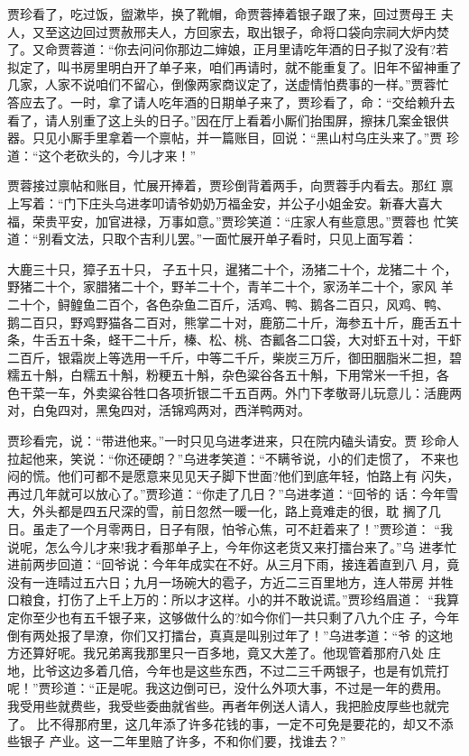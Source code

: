 贾珍看了，吃过饭，盥漱毕，换了靴帽，命贾蓉捧着银子跟了来，回过贾母王
夫人，又至这边回过贾赦邢夫人，方回家去，取出银子，命将口袋向宗祠大炉内焚
了。又命贾蓉道：“你去问问你那边二婶娘，正月里请吃年酒的日子拟了没有?若
拟定了，叫书房里明白开了单子来，咱们再请时，就不能重复了。旧年不留神重了
几家，人家不说咱们不留心，倒像两家商议定了，送虚情怕费事的一样。”贾蓉忙
答应去了。一时，拿了请人吃年酒的日期单子来了，贾珍看了，命：“交给赖升去
看了，请人别重了这上头的日子。”因在厅上看着小厮们抬围屏，擦抹几案金银供
器。只见小厮手里拿着一个禀帖，并一篇账目，回说：“黑山村乌庄头来了。”贾
珍道：“这个老砍头的，今儿才来！”

贾蓉接过禀帖和账目，忙展开捧着，贾珍倒背着两手，向贾蓉手内看去。那红
禀上写着：“门下庄头乌进孝叩请爷奶奶万福金安，并公子小姐金安。新春大喜大
福，荣贵平安，加官进禄，万事如意。”贾珍笑道：“庄家人有些意思。”贾蓉也
忙笑道：“别看文法，只取个吉利儿罢。”一面忙展开单子看时，只见上面写着：

大鹿三十只，獐子五十只，子五十只，暹猪二十个，汤猪二十个，龙猪二十
个，野猪二十个，家腊猪二十个，野羊二十个，青羊二十个，家汤羊二十个，家风
羊二十个，鲟鳇鱼二百个，各色杂鱼二百斤，活鸡、鸭、鹅各二百只，风鸡、鸭、
鹅二百只，野鸡野猫各二百对，熊掌二十对，鹿筋二十斤，海参五十斤，鹿舌五十
条，牛舌五十条，蛏干二十斤，榛、松、桃、杏瓤各二口袋，大对虾五十对，干虾
二百斤，银霜炭上等选用一千斤，中等二千斤，柴炭三万斤，御田胭脂米二担，碧
糯五十斛，白糯五十斛，粉粳五十斛，杂色粱谷各五十斛，下用常米一千担，各
色干菜一车，外卖粱谷牲口各项折银二千五百两。外门下孝敬哥儿玩意儿：活鹿两
对，白兔四对，黑兔四对，活锦鸡两对，西洋鸭两对。

贾珍看完，说：“带进他来。”一时只见乌进孝进来，只在院内磕头请安。贾
珍命人拉起他来，笑说：“你还硬朗？”乌进孝笑道：“不瞒爷说，小的们走惯了，
不来也闷的慌。他们可都不是愿意来见见天子脚下世面?他们到底年轻，怕路上有
闪失，再过几年就可以放心了。”贾珍道：“你走了几日？”乌进孝道：“回爷的
话：今年雪大，外头都是四五尺深的雪，前日忽然一暖一化，路上竟难走的很，耽
搁了几日。虽走了一个月零两日，日子有限，怕爷心焦，可不赶着来了！”贾珍道：
“我说呢，怎么今儿才来!我才看那单子上，今年你这老货又来打擂台来了。”乌
进孝忙进前两步回道：“回爷说：今年年成实在不好。从三月下雨，接连着直到八
月，竟没有一连晴过五六日；九月一场碗大的雹子，方近二三百里地方，连人带房
并牲口粮食，打伤了上千上万的：所以才这样。小的并不敢说谎。”贾珍绉眉道：
“我算定你至少也有五千银子来，这够做什么的?如今你们一共只剩了八九个庄
子，今年倒有两处报了旱潦，你们又打擂台，真真是叫别过年了！”乌进孝道：“爷
的这地方还算好呢。我兄弟离我那里只一百多地，竟又大差了。他现管着那府八处
庄地，比爷这边多着几倍，今年也是这些东西，不过二三千两银子，也是有饥荒打
呢！”贾珍道：“正是呢。我这边倒可已，没什么外项大事，不过是一年的费用。
我受用些就费些，我受些委曲就省些。再者年例送人请人，我把脸皮厚些也就完了。
比不得那府里，这几年添了许多花钱的事，一定不可免是要花的，却又不添些银子
产业。这一二年里赔了许多，不和你们要，找谁去？”


